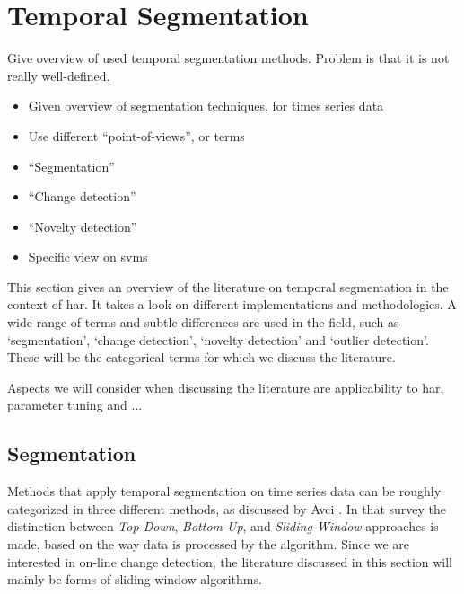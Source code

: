\section{Temporal Segmentation}\label{sec:temporal_segmentation}


Give overview of used temporal segmentation methods. Problem is that it is not really well-defined.

\begin{itemize}
  \item Given overview of segmentation techniques, for times series data
  \item Use different ``point-of-views'', or terms
  \item ``Segmentation''
  \item ``Change detection''
  \item ``Novelty detection''
  \item Specific view on \glspl{svm}
\end{itemize}

This section gives an overview of the literature on temporal segmentation in the context of \gls{har}.
It takes a look on different implementations and methodologies.
A wide range of terms and subtle differences are used in the field, such as `segmentation', `change detection', `novelty detection' and `outlier detection'.
These will be the categorical terms for which we discuss the literature.

Aspects we will consider when discussing the literature are applicability to \gls{har}, parameter tuning and ... 

\subsection{Segmentation}\label{subsec:segmentation}

Methods that apply temporal segmentation on time series data can be roughly categorized in three different methods, as discussed by Avci \etal \cite{avci2010activity}.
In that survey the distinction between \emph{Top-Down}, \emph{Bottom-Up}, and \emph{Sliding-Window} approaches is made, based on the way data is processed by the algorithm.
Since we are interested in on-line change detection, the literature discussed in this section will mainly be forms of sliding-window algorithms.


